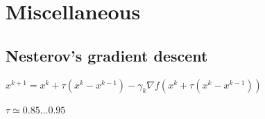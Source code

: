 \chapter{Miscellaneous}

\section{Nesterov's gradient descent}
	$x^{k + 1} = x^k + \tau(x^k - x^{k - 1}) - \gamma_k \nabla f(x^k + \tau(x^k - x^{k - 1}))$

	$\tau \simeq 0.85 \ldots 0.95$

